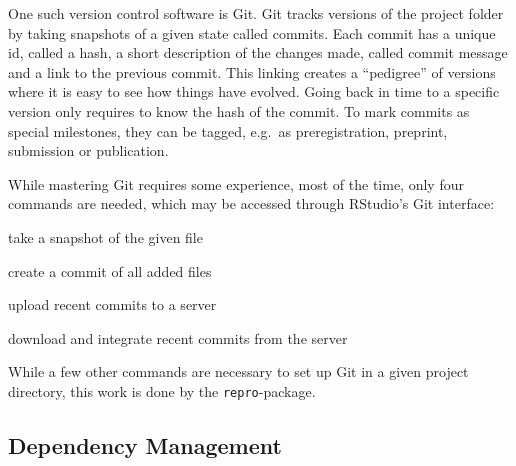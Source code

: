 \documentclass[12pt,a4paper,]{article}
\providecommand{\tightlist}{%
  \setlength{\itemsep}{0pt}\setlength{\parskip}{0pt}}
\begin{document}
One such version control software is Git. Git tracks versions of the project folder by taking snapshots of a given state called commits.
Each commit has a unique id, called a hash, a short description of the changes made, called commit message and a link to the previous commit.
This linking creates a ``pedigree'' of versions where it is easy to see how things have evolved.
Going back in time to a specific version only requires to know the hash of the commit.
To mark commits as special milestones, they can be tagged, e.g.~as preregistration, preprint, submission or publication.

While mastering Git requires some experience, most of the time, only four commands are needed, which may be accessed through RStudio's Git interface:

\begin{description}
\tightlist
\item[git add]
take a snapshot of the given file
\item[git commit]
create a commit of all added files
\item[git push]
upload recent commits to a server
\item[git pull]
download and integrate recent commits from the server
\end{description}

While a few other commands are necessary to set up Git in a given project directory, this work is done by the \texttt{repro}-package.

\hypertarget{dependency-management}{%
\subsection{Dependency Management}\label{dependency-management}}
\end{document}
